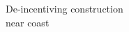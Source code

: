 \documentclass[preview]{standalone}
\begin{document}
\begin{center}
De-incentiving construction\\near coast
\end{center}
\end{document}
